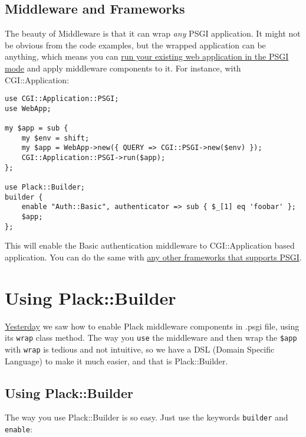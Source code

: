 \section{Middleware and Frameworks}\label{middleware-and-frameworks}

The beauty of Middleware is that it can wrap \emph{any} PSGI
application. It might not be obvious from the code examples, but the
wrapped application can be anything, which means you can
\href{http://advent.plackperl.org/2009/12/day-7-use-web-application-framework-in-psgi.html}{run
your existing web application in the PSGI mode} and apply middleware
components to it. For instance, with CGI::Application:

\begin{lstlisting}
use CGI::Application::PSGI;
use WebApp;

my $app = sub {
    my $env = shift;
    my $app = WebApp->new({ QUERY => CGI::PSGI->new($env) });
    CGI::Application::PSGI->run($app);
};

use Plack::Builder;
builder {
    enable "Auth::Basic", authenticator => sub { $_[1] eq 'foobar' };
    $app;
};
\end{lstlisting}

This will enable the Basic authentication middleware to CGI::Application
based application. You can do the same with
\href{http://plackperl.org/\#frameworks}{any other frameworks that
supports PSGI}.

\chapter{Using Plack::Builder}\label{day-11-using-plackbuilder}

\href{http://advent.plackperl.org/2009/12/day-10-using-plack-middleware.html}{Yesterday}
we saw how to enable Plack middleware components in .psgi file, using
its \lstinline!wrap! class method. The way you \lstinline!use! the
middleware and then wrap the \lstinline!$app! with \lstinline!wrap! is
tedious and not intuitive, so we have a DSL (Domain Specific Language)
to make it much easier, and that is Plack::Builder.

\section{Using Plack::Builder}\label{using-plackbuilder}

The way you use Plack::Builder is so easy. Just use the keywords
\lstinline!builder! and \lstinline!enable!:


